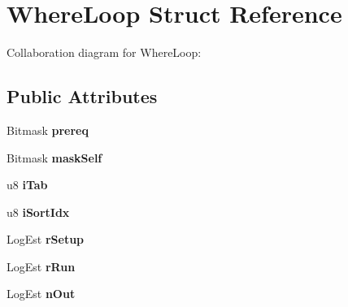 \hypertarget{structWhereLoop}{}\section{Where\+Loop Struct Reference}
\label{structWhereLoop}


Collaboration diagram for Where\+Loop\+:
\subsection*{Public Attributes}
\begin{DoxyCompactItemize}
\item 
Bitmask {\bfseries prereq}\hypertarget{structWhereLoop_aa654af6ecff71bd43c4b0cd6046ccf4d}{}\label{structWhereLoop_aa654af6ecff71bd43c4b0cd6046ccf4d}

\item 
Bitmask {\bfseries mask\+Self}\hypertarget{structWhereLoop_a0118b20be771241ee29de452ffead61e}{}\label{structWhereLoop_a0118b20be771241ee29de452ffead61e}

\item 
u8 {\bfseries i\+Tab}\hypertarget{structWhereLoop_a469ad31ae7f3b025667813e2d0aa9d01}{}\label{structWhereLoop_a469ad31ae7f3b025667813e2d0aa9d01}

\item 
u8 {\bfseries i\+Sort\+Idx}\hypertarget{structWhereLoop_a35e725c988b2bcfb9633a259cd6eba58}{}\label{structWhereLoop_a35e725c988b2bcfb9633a259cd6eba58}

\item 
Log\+Est {\bfseries r\+Setup}\hypertarget{structWhereLoop_a5e28f2d1299993056255158d33baea33}{}\label{structWhereLoop_a5e28f2d1299993056255158d33baea33}

\item 
Log\+Est {\bfseries r\+Run}\hypertarget{structWhereLoop_a1a67183b699c90c23940f540486b07d6}{}\label{structWhereLoop_a1a67183b699c90c23940f540486b07d6}

\item 
Log\+Est {\bfseries n\+Out}\hypertarget{structWhereLoop_aaef49d7d8188f3dd94d0c9fd0e727448}{}\label{structWhereLoop_aaef49d7d8188f3dd94d0c9fd0e727448}


\end{DoxyCompactItemize}

